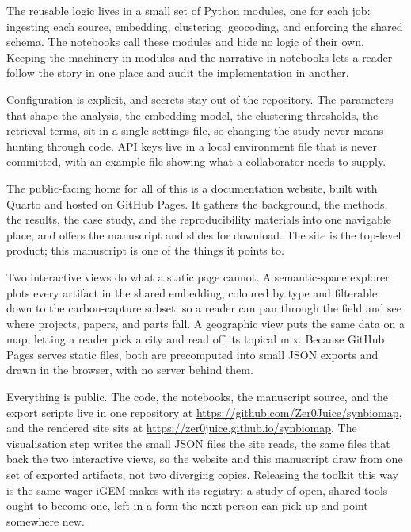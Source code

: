\documentclass[12pt,a4paper]{article}
\begin{document}
	The reusable logic lives in a small set of Python modules, one for each job:
	ingesting each source, embedding, clustering, geocoding, and enforcing the shared
	schema. The notebooks call these modules and hide no logic of their own. Keeping
	the machinery in modules and the narrative in notebooks lets a reader follow the
	story in one place and audit the implementation in another.
	
	Configuration is explicit, and secrets stay out of the repository. The parameters
	that shape the analysis, the embedding model, the clustering thresholds, the
	retrieval terms, sit in a single settings file, so changing the study never means
	hunting through code. API keys live in a local environment file that is never
	committed, with an example file showing what a collaborator needs to supply.
	
	The public-facing home for all of this is a documentation website, built with
	Quarto and hosted on GitHub Pages. It gathers the background, the methods, the
	results, the case study, and the reproducibility materials into one navigable
	place, and offers the manuscript and slides for download. The site is the top-level
	product; this manuscript is one of the things it points to.
	
	Two interactive views do what a static page cannot. A semantic-space explorer plots
	every artifact in the shared embedding, coloured by type and filterable down to the
	carbon-capture subset, so a reader can pan through the field and see where projects,
	papers, and parts fall. A geographic view puts the same data on a map, letting a
	reader pick a city and read off its topical mix. Because GitHub Pages serves static
	files, both are precomputed into small JSON exports and drawn in the browser, with
	no server behind them.
	
	Everything is public. The code, the notebooks, the manuscript source, and the
	export scripts live in one repository at
	\url{https://github.com/Zer0Juice/synbiomap}, and the rendered site sits at
	\url{https://zer0juice.github.io/synbiomap}. The visualisation step writes the small
	JSON files the site reads, the same files that back the two interactive views, so
	the website and this manuscript draw from one set of exported artifacts, not two
	diverging copies. Releasing the toolkit this way is the same wager iGEM makes with
	its registry: a study of open, shared tools ought to become one, left in a form the
	next person can pick up and point somewhere new.
	
\end{document}
